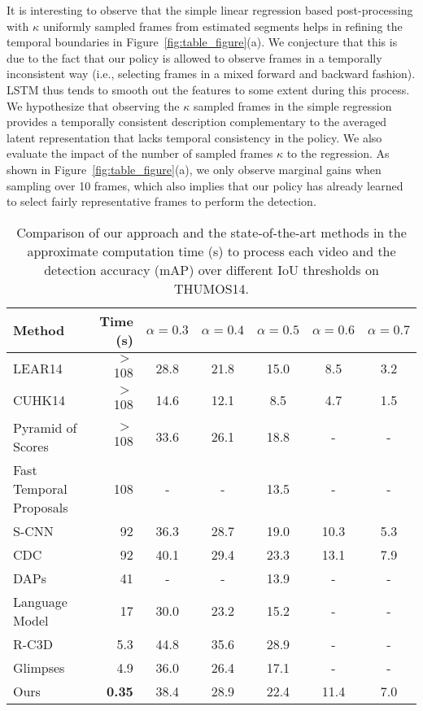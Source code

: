 \documentclass{bmvc2k}
\begin{document}
It is interesting to observe that the simple linear regression based post-processing with $\kappa$ uniformly sampled frames from estimated segments helps in refining the temporal boundaries in Figure~\ref{fig:table_figure}(a). We conjecture that this is due to the fact that our policy is allowed to observe frames in a temporally inconsistent way (i.e., selecting frames in a mixed forward and backward fashion). LSTM thus tends to smooth out the features to some extent during this process. We hypothesize that observing the $\kappa$ sampled frames in the simple regression provides a temporally consistent description complementary to the averaged latent representation that lacks temporal consistency in the policy. We also evaluate the impact of the number of sampled frames $\kappa$ to the regression. As shown in Figure~\ref{fig:table_figure}(a), we only observe marginal gains when sampling over 10 frames, which also implies that our policy has already learned to select fairly representative frames to perform the detection.   

\begin{table*}[h]
	\small
	\centering
	\begin{tabular}{lrccccc}
		\toprule
		Method & Time (s) & $\alpha = 0.3$ & $\alpha = 0.4$ & $\alpha = 0.5$ & $\alpha = 0.6$ & $\alpha = 0.7$ \\
		\midrule
        LEAR14 \cite{oneata2014lear} & $>$ 108 & 28.8& 21.8& 15.0& 8.5& 3.2\\
        CUHK14 \cite{wang2014action}& $>$ 108 & 14.6& 12.1& 8.5& 4.7& 1.5\\
        Pyramid of Scores \cite{score-pyramid} & $>$ 108 & 33.6 & 26.1 & 18.8 & - & - \\
        Fast Temporal Proposals \cite{fast-proposal} & 108 & - & - & 13.5 & - & - \\
        S-CNN \cite{shou2016temporal}& 92 & 36.3 &28.7 & 19.0 &10.3& 5.3\\
        CDC \cite{DBLP:journals/corr/ShouCZMC17} & 92 & 40.1 & 29.4  & 23.3 & 13.1 & 7.9 \\
        DAPs \cite{daps} & 41 & - & - & 13.9 & - & - \\
        Language Model \cite{language-model} & 17 & 30.0 & 23.2 & 15.2 & - & - \\
        R-C3D \cite{r-c3d} & 5.3 & 44.8 & 35.6 & 28.9 & - & - \\
		Glimpses \cite{yeung2015end} & 4.9 & 36.0  & 26.4  & 17.1  & - & - \\
        \midrule
		Ours & \textbf{0.35} & 38.4 & 28.9 & 22.4 & 11.4 & 7.0 \\
		\bottomrule
	\end{tabular}
    \vspace{10pt}
	\caption{Comparison of our approach and the state-of-the-art methods in the approximate computation time (s) to process each video and the detection accuracy (mAP) over different IoU thresholds on THUMOS14.}
	\label{tab:thumos-soa}
\end{table*}
\end{document}
